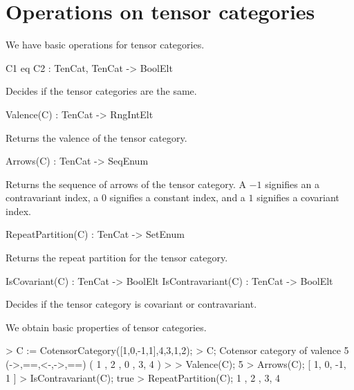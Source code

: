 \section{Operations on tensor categories}

We have basic operations for tensor categories.

\begin{intrinsics}
C1 eq C2 : TenCat, TenCat -> BoolElt
\end{intrinsics}

Decides if the tensor categories are the same.

\begin{intrinsics}
Valence(C) : TenCat -> RngIntElt
\end{intrinsics}

Returns the valence of the tensor category.

\begin{intrinsics}
Arrows(C) : TenCat -> SeqEnum
\end{intrinsics}

Returns the sequence of arrows of the tensor category. 
A $-1$ signifies an a contravariant index, a $0$ signifies a constant index, and a $1$ signifies a covariant index.

\begin{intrinsics}
RepeatPartition(C) : TenCat -> SetEnum
\end{intrinsics}

Returns the repeat partition for the tensor category.

\begin{intrinsics}
IsCovariant(C) : TenCat -> BoolElt
IsContravariant(C) : TenCat -> BoolElt
\end{intrinsics}

Decides if the tensor category is covariant or contravariant.

\begin{example}[TenCatProperties]

We obtain basic properties of tensor categories.
\begin{code}
> C := CotensorCategory([1,0,-1,1],{{4,3},{1},{2}});
> C;
Cotensor category of valence 5 (->,==,<-,->,==) ({ 1 },{ 2 },{ 0 },{ 3, 4 })
> 
> Valence(C);
5
> Arrows(C);
[ 1, 0, -1, 1 ]
> IsContravariant(C);
true
> RepeatPartition(C);
{
    { 1 },
    { 2 },
    { 3, 4 }
}
\end{code}
\end{example}



